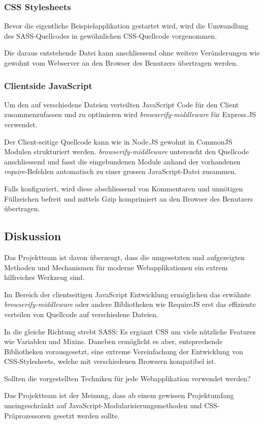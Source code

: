 \subsubsection*{CSS Stylesheets}
Bevor die eigentliche Beispielapplikation gestartet wird, wird die Umwandlung des SASS-Quellcodes in gewöhnlichen CSS-Quellcode vorgenommen.

Die daraus entstehende Datei kann anschliessend ohne weitere Veränderungen wie gewohnt vom Webserver an den Browser des Benutzers übertragen werden.

\subsubsection*{Clientside JavaScript}
Um den auf verschiedene Dateien verteilten JavaScript Code für den Client zusammenzufassen und zu optimieren wird \emph{browserify-middleware} für Express.JS \cite{browserifymiddleware} verwendet.

Der Client-seitige Quellcode kann wie in Node.JS gewohnt in CommonJS Modulen \cite{commonjsmodules} strukturiert werden. \emph{browserify-middleware} untersucht den Quellcode anschliessend und fasst die eingebundenen Module anhand der vorhandenen \emph{require}-Befehlen automatisch zu einer grossen JavaScript-Datei zusammen.

Falls konfiguriert, wird diese abschliessend von Kommentaren und unnötigen Füllzeichen befreit und mittels Gzip \cite{gzip} komprimiert an den Browser des Benutzers übertragen.


\subsection*{Diskussion}
Das Projektteam ist davon überzeugt, dass die umgesetzten und aufgezeigten Methoden und Mechanismen für moderne Webapplikationen ein extrem hilfreiches Werkzeug sind.

Im Bereich der clientseitigen JavaScript Entwicklung ermöglichen das erwähnte \emph{browserify-middleware} oder andere Bibliotheken wie RequireJS \cite{requirejs} erst das effiziente verteilen von Quellcode auf verschiedene Dateien.

In die gleiche Richtung strebt SASS: Es ergänzt CSS um viele nützliche Features wie Variablen und Mixins. Daneben ermöglicht es aber, entsprechende Bibliotheken vorausgesetzt, eine extreme Vereinfachung der Entwicklung von CSS-Stylesheets, welche mit verschiedenen Browsern kompatibel ist.

Sollten die vorgestellten Techniken für jede Webapplikation verwendet werden?

Das Projektteam ist der Meinung, dass ab einem gewissen Projektumfang uneingeschränkt auf JavaScript-Modularisierungsmethoden und CSS-Präprozessoren gesetzt werden sollte.